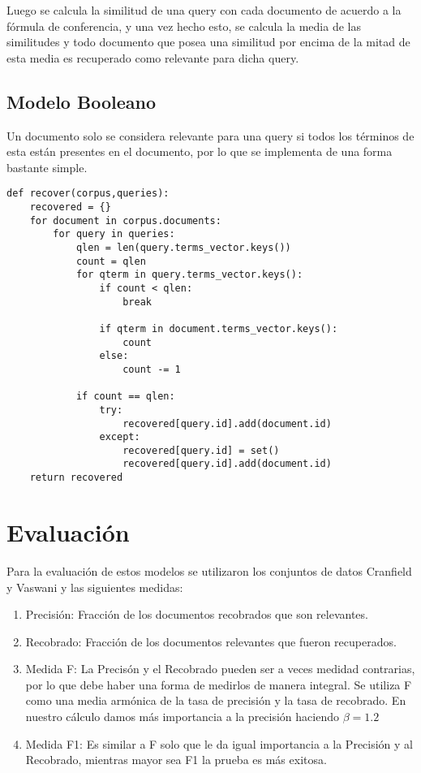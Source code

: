 \documentclass[runningheads,a4paper]{llncs}
\begin{document}
Luego se calcula la similitud de una query con cada documento de acuerdo a la f\'ormula de conferencia, y una vez hecho esto, se calcula la media de las similitudes y todo documento que posea una similitud por encima de la mitad de esta media es recuperado como relevante para dicha query.

\subsection{Modelo Booleano}
Un documento solo se considera relevante para una query si todos los t\'erminos de esta est\'an presentes en el documento,  por lo que se implementa de una forma bastante simple.

\begin{lstlisting}
def recover(corpus,queries):
    recovered = {}
    for document in corpus.documents:
        for query in queries:
            qlen = len(query.terms_vector.keys())
            count = qlen
            for qterm in query.terms_vector.keys():
                if count < qlen:
                    break
                
                if qterm in document.terms_vector.keys():
                    count
                else:
                    count -= 1
            
            if count == qlen:
                try:
                    recovered[query.id].add(document.id)
                except:
                    recovered[query.id] = set()
                    recovered[query.id].add(document.id)
    return recovered
\end{lstlisting}


\section{Evaluaci\'on}
Para la evaluaci\'on de estos modelos se utilizaron los conjuntos de datos Cranfield y Vaswani y las siguientes medidas:
\begin{enumerate}
\item Precisi\'on: Fracci\'on de los documentos recobrados que son relevantes.

\item Recobrado: Fracci\'on de los documentos relevantes que fueron recuperados.

\item Medida F: La Precis\'on y el Recobrado pueden ser a veces medidad contrarias, por lo que debe haber una forma de medirlos de manera integral. Se utiliza F como una media arm\'onica de la tasa de precisi\'on y la tasa de recobrado. En nuestro c\'alculo damos m\'as importancia a la precisi\'on haciendo $\beta=1.2$

\item Medida F1: Es similar a F solo que le da igual importancia a la Precisi\'on y al Recobrado, mientras mayor sea F1 la prueba es m\'as exitosa.
\end{enumerate}
\end{document}

